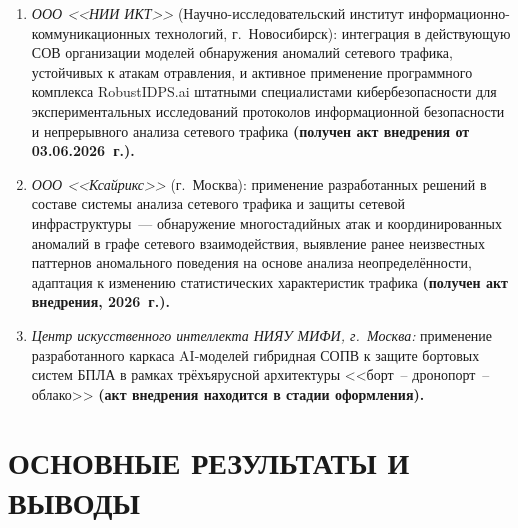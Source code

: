 \documentclass[12pt,a5paper]{article}
\begin{document}
\begin{enumerate}
\item \textit{ООО <<НИИ ИКТ>>} (Научно-исследовательский институт
информационно-коммуникационных технологий, г.~Новосибирск):
интеграция в действующую СОВ организации моделей обнаружения
аномалий сетевого трафика, устойчивых к атакам отравления, и
активное применение программного комплекса RobustIDPS.ai
штатными специалистами кибербезопасности для экспериментальных
исследований протоколов информационной безопасности и
непрерывного анализа сетевого трафика \textbf{(получен акт
внедрения от 03.06.2026~г.).}
\item \textit{ООО <<Ксайрикс>>} (г.~Москва): применение
разработанных решений в составе системы анализа сетевого
трафика и защиты сетевой инфраструктуры~--- обнаружение
многостадийных атак и координированных аномалий в графе
сетевого взаимодействия, выявление ранее неизвестных паттернов
аномального поведения на основе анализа неопределённости,
адаптация к изменению статистических характеристик трафика
\textbf{(получен акт внедрения, 2026~г.).}
\item \textit{Центр искусственного интеллекта НИЯУ МИФИ,
г.~Москва:} применение разработанного каркаса AI-моделей
гибридная СОПВ к защите бортовых систем БПЛА в рамках
трёхъярусной архитектуры <<борт~-- дронопорт~-- облако>>
\textbf{(акт внедрения находится в стадии оформления).}
\end{enumerate}

\section*{ОСНОВНЫЕ РЕЗУЛЬТАТЫ И ВЫВОДЫ}
\end{document}
